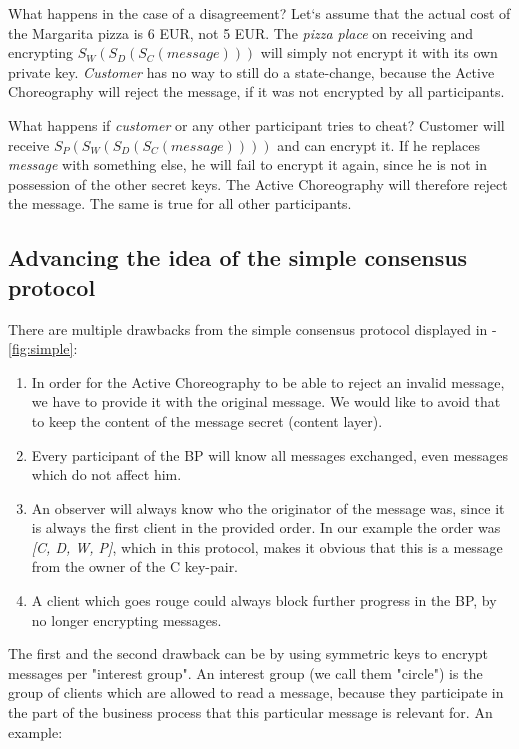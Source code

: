 \documentclass[runningheads]{llncs}
\begin{document}
What happens in the case of a disagreement? Let`s assume that the actual cost of the Margarita pizza is 6 EUR, not 5 EUR. The \textit{pizza place} on receiving and encrypting  $S_W(S_D(S_C(message)))$ will simply not encrypt it with its own private key. \textit{Customer} has no way to still do a state-change, because the Active Choreography will reject the message, if it was not encrypted by all participants. 

What happens if \textit{customer} or any other participant tries to cheat? Customer will receive $S_P(S_W(S_D(S_C(message))))$ and can encrypt it. If he replaces \textit{message} with something else, he will fail to encrypt it again, since he is not in possession of the other secret keys. The Active Choreography will therefore reject the message. The same is true for all other participants. 


\subsection{Advancing the idea of the simple consensus protocol}

There are multiple drawbacks from the simple consensus protocol displayed in -\ref{fig:simple}: 

\begin{enumerate}
    \item In order for the Active Choreography to be able to reject an invalid message, we have to provide it with the original message. We would like to avoid that to keep the content of the message secret (content layer).
    \item Every participant of the BP will know all messages exchanged, even messages which do not affect him. 
    \item An observer will always know who the originator of the message was, since it is always the first client in the provided order. In our example the order was \textit{[C, D, W, P]}, which in this protocol, makes it obvious that this is a message from the owner of the C key-pair.
    \item A client which goes rouge could always block further progress in the BP, by no longer encrypting messages.
\end{enumerate}

The first and the second drawback can be by using symmetric keys to encrypt messages per "interest group". An interest group (we call them "circle") is the group of clients which are allowed to read a message, because they participate in the part of the business process that this particular message is relevant for. An example: 
\end{document}
